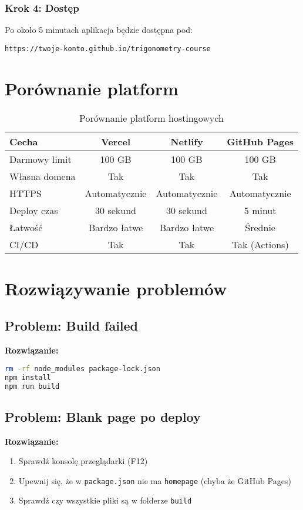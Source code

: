 \documentclass[12pt,a4paper]{article}
\begin{document}
\subsubsection{Krok 4: Dostęp}
Po około 5 minutach aplikacja będzie dostępna pod:
\begin{verbatim}
https://twoje-konto.github.io/trigonometry-course
\end{verbatim}

\newpage
\section{Porównanie platform}

\begin{table}[h]
\centering
\begin{tabular}{|l|c|c|c|}
\hline
\textbf{Cecha} & \textbf{Vercel} & \textbf{Netlify} & \textbf{GitHub Pages} \\
\hline
Darmowy limit & 100 GB & 100 GB & 100 GB \\
\hline
Własna domena & Tak & Tak & Tak \\
\hline
HTTPS & Automatycznie & Automatycznie & Automatycznie \\
\hline
Deploy czas & 30 sekund & 30 sekund & 5 minut \\
\hline
Łatwość & Bardzo łatwe & Bardzo łatwe & Średnie \\
\hline
CI/CD & Tak & Tak & Tak (Actions) \\
\hline
\end{tabular}
\caption{Porównanie platform hostingowych}
\end{table}

\section{Rozwiązywanie problemów}

\subsection{Problem: Build failed}
\textbf{Rozwiązanie:}
\begin{lstlisting}[language=bash]
rm -rf node_modules package-lock.json
npm install
npm run build
\end{lstlisting}

\subsection{Problem: Blank page po deploy}
\textbf{Rozwiązanie:}
\begin{enumerate}
    \item Sprawdź konsolę przeglądarki (F12)
    \item Upewnij się, że w \texttt{package.json} nie ma \texttt{homepage} (chyba że GitHub Pages)
    \item Sprawdź czy wszystkie pliki są w folderze \texttt{build}
\end{enumerate}
\end{document}
